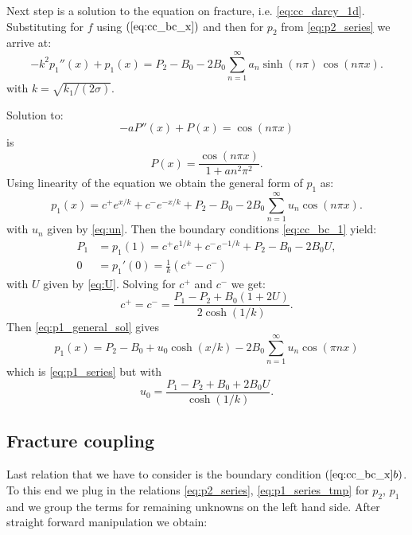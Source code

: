 \documentclass[a4paper,10pt]{article}
\begin{document}
 Next step is a solution to the equation on fracture, i.e. \eqref{eq:cc_darcy_1d}. 
 Substituting for $f$ using $(\ref{eq:cc_bc_x})$ and then for $p_2$ from \eqref{eq:p2_series}
 we arrive at: 
\begin{equation}
    \label{eq:p1_equation}
    -k^2 p_1''(x) + p_1 (x) = P_2 - B_0 - 2 B_0 \sum ^{\infty}_{n=1} a_n \sinh(n\pi)\, \cos (n\pi x).
\end{equation}
with $k = \sqrt{k_1 / (2 \sigma)}$.

Solution to:
\[
    - a P''(x) + P(x) = \cos(n \pi x) 
\]    
is 
\[
    P(x) = \frac{\cos(n \pi x)}{1+an^2\pi^2}.
\]
Using linearity of the equation we obtain the general form of $p_1$ as:
\begin {equation}
    \label{eq:p1_general_sol}        
    p_1(x) = c^+ e^{x/k} + c^- e^{-x/k} + P_2 - B_0 
    - 2 B_0 \sum^{\infty}_{n=1} u_n \cos (n\pi x).
\end {equation}
with $u_n$ given by \eqref{eq:un}. Then the boundary conditions \eqref{eq:cc_bc_1} yield:
\begin{align*}
P_1 &= p_1(1) = c^+e^{1/k} + c^- e^{-1/k} + P_2 - B_0 - 2 B_0 U, \\
0 &= p_1'(0) = \frac{1}{k}(c^+ - c^-) 
\end{align*}
with $U$ given by \eqref{eq:U}. Solving for $c^+$ and $c^-$ we get:
\[
  c^+ = c^- = \frac{P_1 - P_2 + B_0(1 + 2 U)}{2\cosh(1/k)}.
\]
Then \eqref{eq:p1_general_sol} gives 
\begin{equation}
    \label{eq:p1_series_tmp}
    p_1(x) = P_2 -  B_0 + u_0 \cosh(x/k) - 2B_0 \sum_{n=1}^\infty  u_n \cos(\pi n x) 
\end{equation}
which is \eqref{eq:p1_series} but with 
\begin{equation}
    \label{eq:u0_def}    
    u_0 = \frac{P_1 - P_2 + B_0 + 2 B_0 U}{\cosh(1/k)}.
\end{equation}



\subsection{Fracture coupling}
\label{sec:cont_coupling}

Last relation that we have to consider is the boundary condition $(\ref{eq:cc_bc_x}b)$. To this end we plug in the relations \eqref{eq:p2_series}, 
\eqref{eq:p1_series_tmp} for $p_2$, $p_1$  and we group the terms for remaining unknowns on the left hand side. After straight forward
manipulation we obtain:
\end{document}
